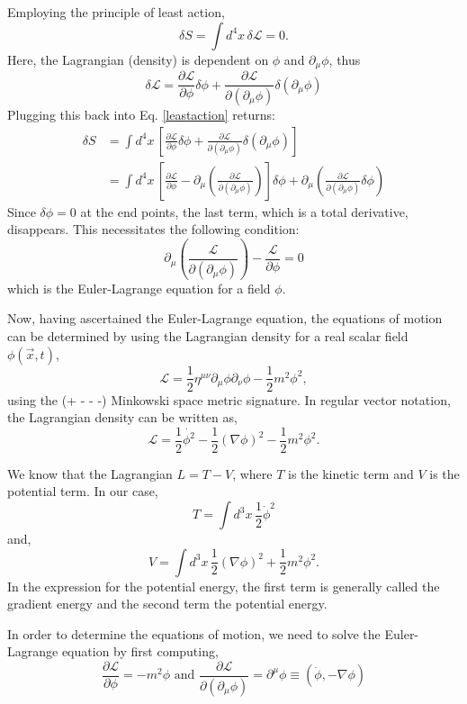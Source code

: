 \documentclass[12pt]{revtex4}
\begin{document}
Employing the principle of least action,
\begin{equation} \label{leastaction}
\delta S = \int d^4 x \, \delta \mathcal{L} = 0.
\end{equation}
Here, the Lagrangian (density) is dependent on $\phi$ and $\partial_{\mu} \phi$, thus
\[ \delta \mathcal{L} = \frac{\partial \mathcal{L}}{\partial \phi} \delta \phi + \frac{\partial \mathcal{L}}{\partial (\partial_{\mu} \phi)} \delta (\partial_{\mu} \phi)\]
Plugging this back into Eq. \ref{leastaction} returns:
\begin{align*}
\delta S &= \int d^4 x \, [\frac{\partial \mathcal{L}}{\partial \phi} \delta \phi + \frac{\partial \mathcal{L}}{\partial (\partial_{\mu} \phi)} \delta (\partial_{\mu} \phi)] \\
&= \int d^4 x \, [\frac{\partial \mathcal{L}}{\partial \phi} - \partial_{\mu}(\frac{\partial \mathcal{L}}{\partial (\partial_{\mu} \phi)})]\delta \phi + \partial_{\mu}(\frac{\partial \mathcal{L}}{\partial (\partial_{\mu} \phi)}\delta \phi)\end{align*} 
Since $\delta \phi = 0$ at the end points, the last term, which is a total derivative, disappears. This necessitates the following condition:
\[ \partial_{\mu}(\frac{\mathcal{L}}{\partial(\partial_{\mu}\phi)}) - \frac{\mathcal{L}}{\partial \phi} = 0\]
which is the Euler-Lagrange equation for a field $\phi$.

Now, having ascertained the Euler-Lagrange equation, the equations of motion can be determined by using the Lagrangian density for a real scalar field $\phi (\vec{x},t)$,
\[ \mathcal{L} = \dfrac{1}{2} \eta^{\mu\nu} \partial_{\mu} \phi \partial_{\nu} \phi - \dfrac{1}{2}m^2\phi^2,\]
using the (+ - - -) Minkowski space metric signature. In regular vector notation, the Lagrangian density can be written as,
\[ \mathcal{L} = \dfrac{1}{2} \dot{\phi^2} - \dfrac{1}{2}(\nabla \phi)^2 - \dfrac{1}{2}m^2\phi^2.\]

We know that the Lagrangian $L=T - V$, where $T$ is the kinetic term and $V$ is the potential term. In our case,
\[ T = \int d^3 x \, \frac{1}{2} \dot{\phi}^2 \]
and,
\[ V = \int d^3 x \, \frac{1}{2} (\nabla \phi)^2 + \frac{1}{2}m^2 \phi^2.\]
In the expression for the potential energy, the first term is generally called the gradient energy and the second term the potential energy.

In order to determine the equations of motion, we need to solve the Euler-Lagrange equation by first computing,
\[ \frac{\partial \mathcal{L}}{\partial \phi} = -m^2 \phi \text{  and  } \frac{\partial \mathcal{L}}{\partial (\partial_{\mu} \phi)} = \partial^{\mu}\phi \equiv (\dot{\phi},-\nabla\phi)\]
\end{document}

